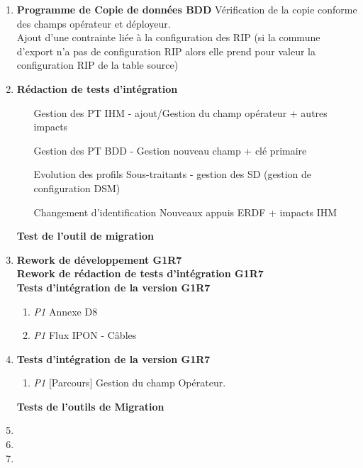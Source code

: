 \begin{enumerate}[label= Semaine \no\textbf{\arabic*.},itemsep=20pt]
\item
\textbf{Programme de Copie de données BDD} Vérification de la copie conforme des champs opérateur et déployeur.
\\ Ajout d'une contrainte liée à la configuration des RIP (si la commune d'export n'a pas
de configuration RIP alors elle prend pour valeur la configuration RIP de la table source)
\item
\textbf{Rédaction de tests d'intégration}
\begin{enumerate}[label = Développement \no\arabic*.,align=left]
	\item [Gestion des PT]  IHM - ajout/Gestion du champ opérateur + autres impacts
	\item [Gestion des PT]  BDD - Gestion nouveau champ + clé primaire
	\item [Evolution des profils] Sous-traitants - gestion des SD (gestion de configuration DSM)
	\item [Changement d’identification] Nouveaux appuis ERDF  + impacts IHM
\end{enumerate}
\textbf{Test de l'outil de migration}
\item \textbf{Rework de développement G1R7}
\\\textbf{Rework de rédaction de tests d'intégration G1R7}
\\\textbf{Tests d'intégration de la version G1R7}
\begin{enumerate}[label = Tests \no\arabic*.,align=left]
\item \emph{\colorbox{rouge}{P1}} Annexe D8
\item \emph{\colorbox{rouge}{P1}} Flux IPON - Câbles
\end{enumerate}

\item
\textbf{Tests d'intégration de la version G1R7}
\begin{enumerate}[label = Tests \no\arabic*.,align=left]
\item \emph{\colorbox{rouge}{P1}} [Parcours] Gestion du champ Opérateur.
\end{enumerate}
\textbf{Tests de l'outils de Migration}
\item
\item
\item
\end{enumerate}
